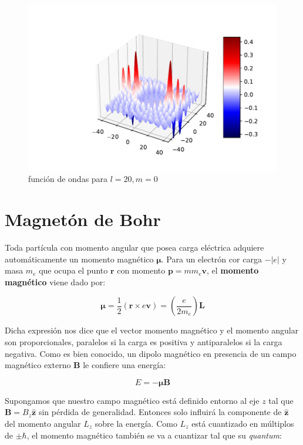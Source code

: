 \documentclass[12pt]{article}
\newcommand{\parentesis}[1]{\left( #1  \right)}
\newcommand{\rn}{\mathbf{r}}
\newcommand{\pn}{\mathbf{p}}
\newcommand{\vn}{\mathbf{v}}
\newcommand{\Ln}{\mathbf{L}}
\newcommand{\zn}{\mathbf{\hat{z}}}
\newcommand{\nmu}{\boldsymbol{\mu}}
\newcommand{\Bn}{\mathbf{B}}
\begin{document}
\begin{figure}[h!] \centering
\includegraphics[scale=1]{funcionesbessel20.pdf}
\caption{función de ondas para $l=20,m=0$}
\label{Fig:funcionesbessel20}
\end{figure}

\newpage

\section{Magnetón de Bohr}

Toda partícula con momento angular que posea carga eléctrica adquiere automáticamente un momento magnético $\nmu$. Para un electrón cor carga $-|e|$ y masa $m_e$ que ocupa el punto $\rn$ con momento $\pn = mm_e \vn$, el \textbf{momento magnético} viene dado por:

\begin{equation}
\nmu = \dfrac{1}{2} (\rn \times e \vn) = \parentesis{\dfrac{e}{2 m_e}} \Ln
\end{equation}

Dicha expresión nos dice que el vector momento magnético y el momento angular son proporcionales, paralelos si la carga es positiva y antiparalelos si la carga negativa. Como es bien conocido, un dipolo magnético en presencia de un campo magnético externo $\Bn$ le confiere una energía:

\begin{equation}
E = - \nmu \Bn
\end{equation} 

Supongamos que nuestro campo magnético está definido entorno al eje $z$ tal que $\Bn = B_z \zn$ sin pérdida de generalidad. Entonces solo influirá la componente de $\zn$ del momento angular $L_z$ sobre la energía. Como $L_z$ está cuantizado en múltiplos de $\pm \hbar$, el momento magnético también se va a cuantizar tal que su \textit{quantum}:
\end{document}
